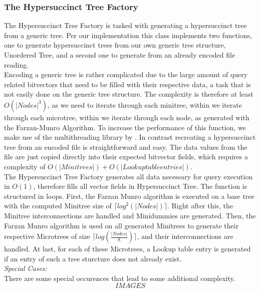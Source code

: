 \documentclass{article}
\begin{document}
\subsubsection{The Hypersuccinct Tree Factory}
The Hypersuccinct Tree Factory is tasked with generating a hypersuccinct tree from a generic tree. Per our implementation this class implements two functions, one to generate hypersuccinct trees from our own generic tree structure, Unordered Tree, 
and a second one to generate from an already encoded file reading.\\
Encoding a generic tree is rather complicated due to the large amount of query related bitvectors that need to be filled with their respective data, a task that is not easily done on the generic tree structure. The complexity is therefore at least $O(|Nodes|^3)$, as we need to iterate through each minitree, within we iterate through each microtree, within we iterate through each node, as generated with the Farzan-Munro Algorithm. To increase the performance of this function, we make use of the multithreading library by \cite{threading}.
In contrast recreating a hypersuccinct tree from an encoded file is straightforward and easy. The data values from the file are just copied directly into their expected bitvector fields, which requires a complexity of $O(|Minitrees|) + O(|Lookup table entries|)$.\\
The Hypersuccinct Tree Factory generates all data necessary for query execution in $O(1)$, therefore fills all vector fields in Hypersuccinct Tree. The function is structured in loops. First, the Farzan Munro algorithm is executed on a base tree with the computed Minitree size of $\lceil log^2( |Nodes| ) \rceil$. Right after this, the Minitree interconnections are handled and Minidummies are generated. Then, the Farzan Munro algorithm is used on all generated Minitrees to generate their respective Microtrees of size $\lceil log( \frac{|Nodes|}{8} ) \rceil$, and their interconnections are handled. At last, for each of these Microtrees, a Lookup table entry is generated if an entry of such a tree sturcture does not already exist.\\
\textit{Special Cases:}\\
There are some special occurences that lead to some additional complexity.\\
$$IMAGES$$
\end{document}
